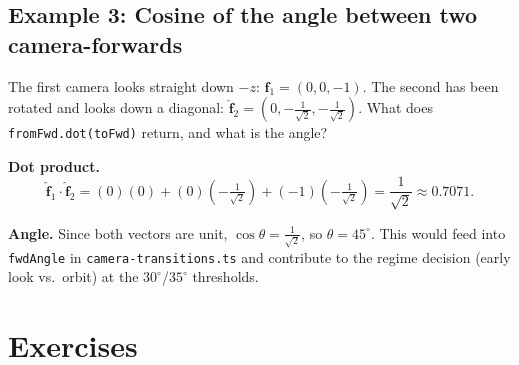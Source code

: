 \documentclass{article}
\begin{document}
\subsection*{Example 3: Cosine of the angle between two camera-forwards}

The first camera looks straight down $-z$: $\hat{\mathbf{f}}_1 = (0, 0, -1)$.
The second has been rotated and looks down a diagonal:
$\hat{\mathbf{f}}_2 = (0, -\tfrac{1}{\sqrt{2}}, -\tfrac{1}{\sqrt{2}})$. What
does \texttt{fromFwd.dot(toFwd)} return, and what is the angle?

\textbf{Dot product.}
\[
\hat{\mathbf{f}}_1 \cdot \hat{\mathbf{f}}_2
   = (0)(0) + (0)\!\left(-\tfrac{1}{\sqrt{2}}\right) + (-1)\!\left(-\tfrac{1}{\sqrt{2}}\right)
   = \frac{1}{\sqrt{2}} \approx 0.7071.
\]

\textbf{Angle.} Since both vectors are unit, $\cos\theta = \tfrac{1}{\sqrt{2}}$,
so $\theta = 45^\circ$. This would feed into \texttt{fwdAngle} in
\texttt{camera-transitions.ts} and contribute to the regime decision (early
look vs.\ orbit) at the $30^\circ$/$35^\circ$ thresholds.

\section{Exercises}
\end{document}
